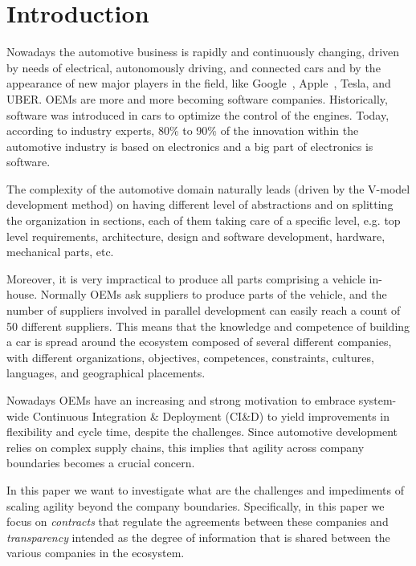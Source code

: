 \section{Introduction}\label{sec:intro}


Nowadays the automotive business is rapidly and continuously changing, driven by needs of 
electrical, autonomously driving, and connected cars and by the appearance of new major players in
the field, like Google~\cite{Google}, Apple~\cite{Apple,Apple2}, Tesla, and UBER.
OEMs are more and more becoming software companies. 
Historically, software was introduced in cars
to optimize the control of the engines. 
Today, according to industry experts, 80\%
to 90\% of the innovation within the automotive industry is
based on electronics and a big part of electronics is software. 

The complexity of the automotive domain naturally leads (driven by the V-model development method) on having different level of abstractions and on splitting the organization in sections, each of them taking care of a specific level, e.g. top level requirements,
architecture, design and software development, hardware, mechanical parts, etc. 

Moreover, it is very impractical to produce all parts comprising a vehicle in-house. Normally OEMs 
ask suppliers to produce parts of the vehicle, and the number of suppliers involved in parallel development can easily
reach a count of 50 different suppliers. 
This means that the knowledge and competence of building a car is spread around the ecosystem composed of several different companies, with different organizations, objectives, competences, constraints, cultures, languages, and geographical placements. 

Nowadays OEMs have an increasing and strong motivation
to embrace system-wide Continuous Integration \& Deployment (CI\&D) to yield improvements
in flexibility and cycle time, despite the challenges. 
Since automotive development relies on complex supply chains, this implies that agility across company boundaries becomes a crucial concern.

In this paper we want to investigate what are the challenges and impediments of scaling agility beyond the company boundaries.  
Specifically, in this paper we focus on {\em contracts} that regulate the agreements between these companies 
and {\em transparency} intended as the degree of information that is shared between the various companies in the ecosystem. 

